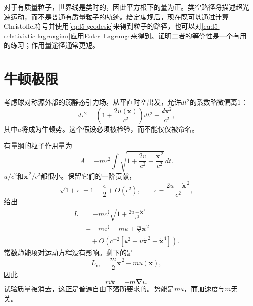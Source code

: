 \begin{classroomqa}
\end{classroomqa}

对于有质量粒子，世界线是类时的，因此平方根下的量为正。类空路径将描述超光速运动，而不是普通有质量粒子的轨迹。给定度规后，现在既可以通过计算Christoffel符号并使用\eqref{eq:l5-geodesic}来得到粒子的路径，也可以对\eqref{eq:l5-relativistic-lagrangian}应用Euler--Lagrange来得到。证明二者的等价性是一个有用的练习；作用量途径通常更短。

\section{牛顿极限}

考虑球对称源外部的弱静态引力场。从平直时空出发，允许\(dt^2\)的系数略微偏离1：
\begin{equation}
d\tau^2
=\left(1+\frac{2u(\mathbf{x})}{c^2}\right)dt^2
-\frac{d\mathbf{x}^2}{c^2},
\label{eq:l5-weak-metric}
\end{equation}
其中\(u\)将成为牛顿势。这个假设必须被检验，而不能仅仅被命名。

有量纲的粒子作用量为
\begin{equation}
A=-mc^2\int
\sqrt{1+\frac{2u}{c^2}
-\frac{\dot{\mathbf{x}}^{\,2}}{c^2}}\,dt.
\label{eq:l5-weak-action}
\end{equation}
\(u/c^2\)和\(\dot{\mathbf{x}}^{\,2}/c^2\)都很小。保留它们的一阶贡献，
\begin{equation}
\sqrt{1+\epsilon}
=1+\frac{\epsilon}{2}+O(\epsilon^2),
\qquad
\epsilon=\frac{2u-\dot{\mathbf{x}}^{\,2}}{c^2},
\end{equation}
给出
\begin{align}
L
&=-mc^2
\sqrt{1+\frac{2u-\dot{\mathbf{x}}^{\,2}}{c^2}}\\
&=-mc^2-mu+\frac{m}{2}\dot{\mathbf{x}}^{\,2}\\
&\quad+O\!\left(c^{-2}
 [u^2+u\dot{\mathbf{x}}^{\,2}+\dot{\mathbf{x}}^{\,4}]\right).
\label{eq:l5-newton-expansion}
\end{align}
常数静能项对运动方程没有影响。剩下的是
\begin{equation}
L_{\mathrm{nr}}
=\frac{m}{2}\dot{\mathbf{x}}^{\,2}-m u(\mathbf{x}),
\label{eq:l5-newton-lagrangian}
\end{equation}
因此
\begin{equation}
m\ddot{\mathbf{x}}=-m\boldsymbol{\nabla}u.
\label{eq:l5-newton-equation}
\end{equation}
试验质量被消去，这正是普遍自由下落所要求的。势能是\(m u\)，而加速度与\(m\)无关。

